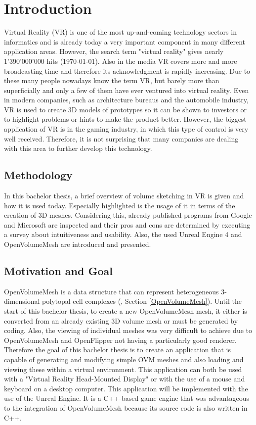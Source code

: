 \documentclass{report}
\begin{document}
\chapter{Introduction}
	Virtual Reality (VR) is one of the most up-and-coming technology sectors in informatics and is already today a very important component in many different application areas. However, the search term "virtual reality" gives nearly 1'390'000'000 hits (\today). Also in the media VR covers more and more broadcasting time and therefore its acknowledgment is rapidly increasing.  Due to these many people nowadays know the term VR, but barely more than superficially and only a few of them have ever ventured into virtual reality. Even in modern companies, such as architecture bureaus and the automobile industry, VR is used to create 3D models of prototypes so it can be shown to investors or to highlight problems or hints to make the product better. However, the biggest application of VR is in the gaming industry, in which this type of control is very well received. Therefore, it is not surprising that many companies are dealing with this area to further develop this technology.	
	
	\section{Methodology}
	\startsection
		In this bachelor thesis, a brief overview of volume sketching in VR is given and how it is used today. Especially highlighted is the usage of it in terms of the creation of 3D meshes. Considering this, already published programs from Google and Microsoft are inspected and their pros and cons are determined by executing a survey about intuitiveness and usability. Also, the used Unreal Engine 4 and OpenVolumeMesh are introduced and presented.
	\closesection
	
	\section{Motivation and Goal}
	\startsection
		OpenVolumeMesh is a data structure that can represent heterogeneous 3-dimensional polytopal cell complexes (\citep{KBK13}, Section \ref{OpenVolumeMesh}). Until the start of this bachelor thesis, to create a new OpenVolumeMesh mesh, it either is converted from an already existing 3D volume mesh or must be generated by coding. Also, the viewing of individual meshes was very difficult to achieve due to OpenVolumeMesh and OpenFlipper not having a particularly good renderer. \\
		Therefore the goal of this bachelor thesis is to create an application that is capable of generating and modifying simple OVM meshes and also loading and viewing these within a virtual environment. This application can both be used with a "Virtual Reality Head-Mounted Display" or with the use of a mouse and keyboard on a desktop computer. This application will be implemented with the use of the Unreal Engine. It is a C++-based game engine that was advantageous to the integration of OpenVolumeMesh because its source code is also written in C++. 
	\closesection
	
\end{document}
